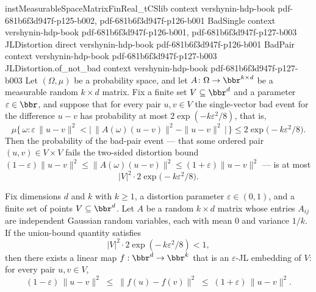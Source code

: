 \begin{theorem}
\label{jl_union_bound}
\leanok
{}
\proofstep
  {instMeasurableSpaceMatrixFinReal_tCSlib}
  {context}
  {vershynin-hdp-book}
  {pdf-681b6f3d947f-p125-b002,
    pdf-681b6f3d947f-p126-b001}
\proofstep
  {BadSingle}
  {context}
  {vershynin-hdp-book}
  {pdf-681b6f3d947f-p126-b001,
    pdf-681b6f3d947f-p127-b003}
\proofstep
  {JLDistortion}
  {direct}
  {vershynin-hdp-book}
  {pdf-681b6f3d947f-p126-b001}
\proofstep
  {BadPair}
  {context}
  {vershynin-hdp-book}
  {pdf-681b6f3d947f-p127-b003}
\proofstep
  {JLDistortion.of_not_bad}
  {context}
  {vershynin-hdp-book}
  {pdf-681b6f3d947f-p127-b003}
Let $(\Omega,\mu)$ be a probability space, and let $A\colon\Omega\to\bbr^{k\times d}$ be
a measurable random $k\times d$ matrix. Fix a finite set $V\subseteq\bbr^d$ and a
parameter $\varepsilon\in\bbr$, and suppose that for every pair $u,v\in V$ the
single-vector bad event for the difference $u-v$ has probability at most
$2\exp(-k\varepsilon^2/8)$, that is,
\[
\mu\bigl\{\,\omega : \varepsilon\,\|u-v\|^2 < \bigl|\,\|A(\omega)(u-v)\|^2 -
\|u-v\|^2\,\bigr|\,\bigr\} \le 2\exp\!\bigl(-k\varepsilon^2/8\bigr).
\]
Then the probability of the bad-pair event — that some ordered pair $(u,v)\in V\times V$
fails the two-sided distortion bound $(1-\varepsilon)\|u-v\|^2 \le \|A(\omega)(u-v)\|^2
\le (1+\varepsilon)\|u-v\|^2$ — is at most
\[
  |V|^2 \cdot 2\exp\!\bigl(-k\varepsilon^2/8\bigr).
\]
\end{theorem}

\begin{theorem}
\label{johnson_lindenstrauss_of_gaussian}
\leanok
{}
Fix dimensions $d$ and $k$ with $k \ge 1$, a distortion parameter $\varepsilon \in
(0,1)$, and a finite set of points $V \subseteq \bbr^d$. Let $A$ be a random $k \times
d$ matrix whose entries $A_{ij}$ are independent Gaussian random variables, each with
mean $0$ and variance $1/k$. If the union-bound quantity satisfies
\[
  |V|^2 \cdot 2\exp\!\left(-\,k\varepsilon^2/8\right) < 1,
\]
then there exists a linear map $f : \bbr^d \to \bbr^k$ that is an $\varepsilon$-JL
embedding of $V$: for every pair $u, v \in V$,
\[
  (1-\varepsilon)\,\|u-v\|^2 \;\le\; \|f(u)-f(v)\|^2 \;\le\; (1+\varepsilon)\,\|u-v\|^2.
\]
\end{theorem}


